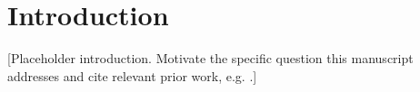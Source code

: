 \section{Introduction}
[Placeholder introduction. Motivate the specific question this manuscript
addresses and cite relevant prior work, e.g. \cite{Placeholder2020}.]
